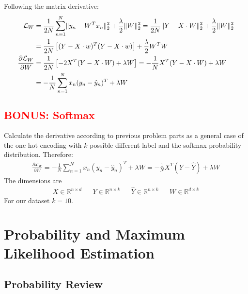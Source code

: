 \documentclass[12pt]{article}
\begin{document}
Following the matrix derivative:
\begin{align}
	\mathcal{L}_W &= \notag \frac{1}{2N}\sum_{n=1}^{N}\lVert y_n -W^Tx_n\rVert_2^2+\frac{\lambda}{2}\lVert W \rVert_2^2=\frac{1}{2N}\lVert Y-X\cdot W\rVert_2^2 + \frac{\lambda}{2}\lVert W \rVert_2^2 \\ \notag
	&= \frac{1}{2N}\left[ (Y - X\cdot w)^T(Y-X\cdot w) \right] + \frac{\lambda}{2}W^TW\\
	\frac{\partial \mathcal{L}_W}{\partial W} \notag &= \frac{1}{2N}\left[ -2X^T (Y-X\cdot W) + \lambda W \right] = -\frac{1}{N}X^T(Y-X\cdot W) + \lambda W \\
	&= -\frac{1}{N}\sum_{n=1}^{N} x_n(y_n - \hat{y}_n)^T + \lambda W
\end{align}

\subsection{\textcolor{red}{BONUS: Softmax}}

Calculate the derivative according to previous problem parts as a general case of the one hot encoding with $k$ possible different label and the softmax probability distribution. Therefore:
\begin{align}
	\frac{\partial \mathcal{L}_W}{\partial W} = -\frac{1}{N}\sum_{n=1}^{N}x_n(y_n-\hat{y}_n)^T + \lambda W = - \frac{1}{N} X^T (Y-\hat{Y}) + \lambda W
\end{align}
\noindent
The dimensions are 
\begin{align*}
	X\in \mathbb{R}^{n\times d} && Y \in \mathbb{R}^{n\times k} && \hat{Y}\in\mathbb{R}^{n\times k} && W \in \mathbb{R}^{d\times k}
\end{align*}
For our dataset $k=10$.



\newpage

\section{Probability and Maximum Likelihood Estimation}

\subsection{Probability Review}
\end{document}
